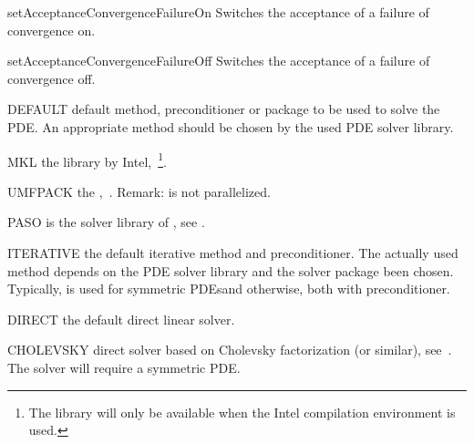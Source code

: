 \begin{methoddesc}[SolverOptions]{setAcceptanceConvergenceFailureOn}{}
Switches the acceptance of a failure of convergence on.  
\end{methoddesc}

\begin{methoddesc}[SolverOptions]{setAcceptanceConvergenceFailureOff}{}
Switches the acceptance of a failure of convergence off.
\end{methoddesc}
    
\begin{memberdesc}[SolverOptions]{DEFAULT}
default method, preconditioner or package to be used to solve the PDE. An appropriate method should be
chosen by the used PDE solver library.
\end{memberdesc}

\begin{memberdesc}[SolverOptions]{MKL}
the \MKL library by Intel,~\footnote{The \MKL library will only be available when the Intel compilation environment is used.}.
\end{memberdesc}

\begin{memberdesc}[SolverOptions]{UMFPACK}
the \UMFPACK,~. Remark: \UMFPACK is not parallelized.
\end{memberdesc}

\begin{memberdesc}[SolverOptions]{PASO}
\PASO is the solver library of \finley, see .
\end{memberdesc}

\begin{memberdesc}[SolverOptions]{ITERATIVE}
the default iterative method and preconditioner. The actually used method depends on the PDE solver library and the solver package been chosen. Typically, \PCG is used for symmetric PDEsand \BiCGStab otherwise, both with \JACOBI preconditioner.
\end{memberdesc}

\begin{memberdesc}[SolverOptions]{DIRECT}
the default direct linear solver.
\end{memberdesc}

\begin{memberdesc}[SolverOptions]{CHOLEVSKY}
direct solver based on Cholevsky factorization (or similar), see~. The solver will require a symmetric PDE.
\end{memberdesc}

